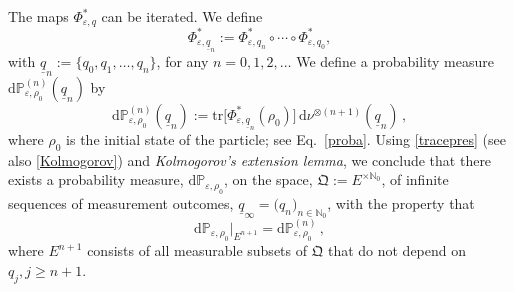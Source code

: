 \documentclass[11pt]{article}
\begin{document}
The maps $\Phi_{\varepsilon, q}^{*}$ can be iterated. We define 
\begin{equation}\label{iterated state}
\Phi_{\varepsilon,\underline{q}_n}^{*} := \Phi_{\varepsilon,q_n}^{*}\circ \cdots \circ \Phi_{\varepsilon,q_0}^{*},
\end{equation}
with $\underline{q}_{n}:=\big\{q_0, q_1, \dots, q_n\big\}$, for any $n=0, 1,2, \dots$ 
We define a probability measure $\text{d}\mathbb{P}_{\varepsilon,\rho_0}^{(n)}(\underline{q}_n)$ by
\begin{equation}\label{prob-measure}
\text{d}\mathbb{P}^{(n)}_{\varepsilon, \rho_0}(\underline{q}_n):= \text{tr}\big[\Phi^{*}_{\varepsilon, \underline{q}_n}(\rho_0)\big]\, \text{d}\nu^{\otimes (n+1)}(\underline{q}_n)\,,
\end{equation}
where $\rho_0$ is the initial state of the particle; see Eq.~\eqref{proba}. Using \eqref{tracepres} 
(see also \eqref{Kolmogorov}) and \textit{Kolmogorov's extension lemma}, we conclude that there exists a probability measure, 
$\text{d}\mathbb{P}_{\varepsilon, \rho_0}$, on the space, $\mathfrak{Q}:=E^{\times\mathbb{N}_0}$, of infinite sequences 
of measurement outcomes, $\underline{q}_{\infty}= \big(q_n\big)_{n\in \mathbb{N}_0}$, with the property that 
\begin{equation}\label{P-meas}
\text{d}\mathbb{P}_{\varepsilon, \rho_0}\big|_{E^{n+1}}= \text{d}\mathbb{P}^{(n)}_{\varepsilon, \rho_0}\,,
\end{equation}
where $E^{n+1}$ consists of all measurable subsets of $\mathfrak{Q}$ that do not depend on $q_j, j\geq n+1$. 
\end{document}
